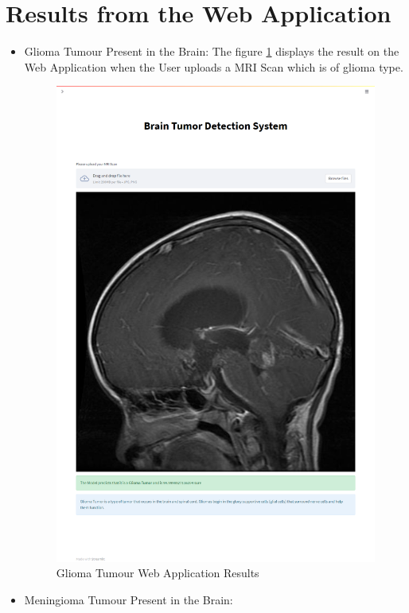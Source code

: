 \section{Results from the Web Application}
\begin{itemize}
    \item Glioma Tumour Present in the Brain:
          The figure \ref{fig:glioma_res_web} displays the result on the Web Application when the User uploads a MRI Scan which is of glioma type.
        \begin{figure}[H]
        \includegraphics[scale=0.3]{Photos/Resule_glio_web.png}
        \caption{Glioma Tumour Web Application Results} \label{fig:glioma_res_web}
        \end{figure} 
        \vfill
    \item Meningioma Tumour Present in the Brain:

\end{itemize}
